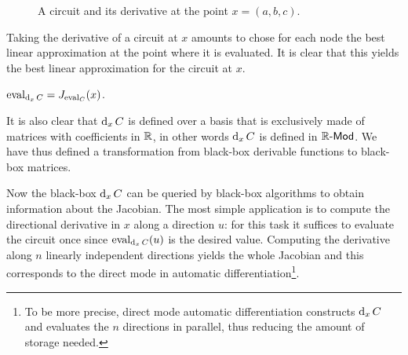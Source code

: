 \begin{figure}[!ht]
  \centering
  \caption{A circuit and its derivative at the point $x=(a,b,c)$.}
  \label{fig:derivative}
\end{figure}

Taking the derivative of a circuit at $x$ amounts to chose for each
node the best linear approximation at the point where it is
evaluated. It is clear that this yields the best linear approximation
for the circuit at $x$.

\begin{proposition}
  $\operatorname{eval}_{\operatorname{d}_xC}=J_{\operatorname{eval}_C}(x)$.
\end{proposition}

It is also clear that $\operatorname{d}_xC$ is defined over a basis that is
exclusively made of matrices with coefficients in $\mathbb{R}$, in other words
$\operatorname{d}_xC$ is defined in $\mathbb{R}\text{\sf-Mod}$. We have thus defined a
transformation from black-box derivable functions to black-box
matrices.

Now the black-box $\operatorname{d}_xC$ can be queried by black-box algorithms to
obtain information about the Jacobian. The most simple application is
to compute the directional derivative in $x$ along a direction $u$:
for this task it suffices to evaluate the circuit once since
$\operatorname{eval}_{\operatorname{d}_xC}(u)$ is the desired value. Computing the derivative
along $n$ linearly independent directions yields the whole Jacobian
and this corresponds to the direct mode in automatic
differentiation\footnote{To be more precise, direct mode automatic
  differentiation constructs $\operatorname{d}_xC$ and evaluates the $n$
  directions in parallel, thus reducing the amount of storage
  needed.}.

